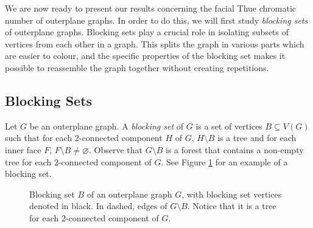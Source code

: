\documentclass{patmorin}
\let\emptyset\varnothing
\begin{document}
We are now ready to present our results concerning the facial Thue chromatic number of outerplane graphs.
In order to do this, we will first study \emph{blocking sets} of outerplane graphs. Blocking sets play a crucial role in isolating subsets of vertices from each other in a graph. This splits the graph in various parts which are easier to colour, and the specific properties of the blocking set makes it possible to reassemble the graph together without creating repetitions. 

\subsection{Blocking Sets}

Let $G$ be an outerplane graph. A \emph{blocking set} of $G$ is a set
of vertices $B \subseteq V(G)$ such that for each 2-connected component
$H$ of $G$, $H \setminus B$ is a tree and for each inner face $F$,
$F \setminus B \not= \emptyset$. 
Observe that $G\setminus B$ is a forest that contains a non-empty tree
for each 2-connected component of $G$.
See Figure \ref{fig:blocking_set} for an example of a blocking set. 


\begin{figure}[!ht]
  \centering
  
  
   \caption{Blocking set $B$ of an outerplane graph $G$, with blocking set vertices denoted in black. In dashed, edges of $G\setminus B$. Notice that it is a tree for each 2-connected component of $G$.}

  \label{fig:blocking_set}  
\end{figure}
\end{document}
